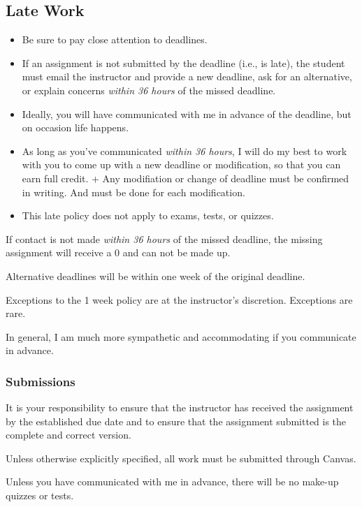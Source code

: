 \documentclass[
]{book}
\providecommand{\tightlist}{%
  \setlength{\itemsep}{0pt}\setlength{\parskip}{0pt}}
\begin{document}
\hypertarget{late-work}{%
\subsection{Late Work}\label{late-work}}

\begin{itemize}
\tightlist
\item
  Be sure to pay close attention to deadlines.
\item
  If an assignment is not submitted by the deadline (i.e., is late), the student must email the instructor and provide a new deadline, ask for an alternative, or explain concerns \emph{within 36 hours} of the missed deadline.
\item
  Ideally, you will have communicated with me in advance of the deadline, but on occasion life happens.
\item
  As long as you've communicated \emph{within 36 hours}, I will do my best to work with you to come up with a new deadline or modification, so that you can earn full credit. + Any modifiation or change of deadline must be confirmed in writing. And must be done for each modification.
\item
  This late policy does not apply to exams, tests, or quizzes.
\end{itemize}

If contact is not made \emph{within 36 hours} of the missed deadline, the missing assignment will receive a 0 and can not be made up.

Alternative deadlines will be within one week of the original deadline.

Exceptions to the 1 week policy are at the instructor's discretion. Exceptions are rare.

In general, I am much more sympathetic and accommodating if you communicate in advance.

\hypertarget{submissions}{%
\subsubsection{Submissions}\label{submissions}}

It is your responsibility to ensure that the instructor has received the assignment by the established due date and to ensure that the assignment submitted is the complete and correct version.

Unless otherwise explicitly specified, all work must be submitted through Canvas.

Unless you have communicated with me in advance, there will be no make-up quizzes or tests.
\end{document}
